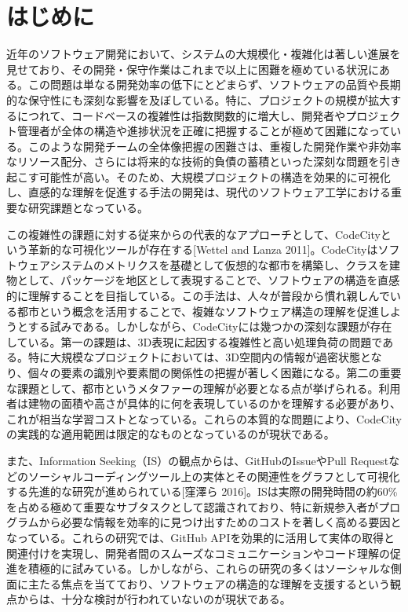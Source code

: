\documentclass[12pt,twoside]{jbook}
\begin{document}
\listoffigures         %
\listoftables          %


%
%
\chapter{はじめに}
近年のソフトウェア開発において、システムの大規模化・複雑化は著しい進展を見せており、その開発・保守作業はこれまで以上に困難を極めている状況にある。この問題は単なる開発効率の低下にとどまらず、ソフトウェアの品質や長期的な保守性にも深刻な影響を及ぼしている。特に、プロジェクトの規模が拡大するにつれて、コードベースの複雑性は指数関数的に増大し、開発者やプロジェクト管理者が全体の構造や進捗状況を正確に把握することが極めて困難になっている。このような開発チームの全体像把握の困難さは、重複した開発作業や非効率なリソース配分、さらには将来的な技術的負債の蓄積といった深刻な問題を引き起こす可能性が高い。そのため、大規模プロジェクトの構造を効果的に可視化し、直感的な理解を促進する手法の開発は、現代のソフトウェア工学における重要な研究課題となっている。

この複雑性の課題に対する従来からの代表的なアプローチとして、CodeCityという革新的な可視化ツールが存在する[Wettel and Lanza 2011]。CodeCityはソフトウェアシステムのメトリクスを基礎として仮想的な都市を構築し、クラスを建物として、パッケージを地区として表現することで、ソフトウェアの構造を直感的に理解することを目指している。この手法は、人々が普段から慣れ親しんでいる都市という概念を活用することで、複雑なソフトウェア構造の理解を促進しようとする試みである。しかしながら、CodeCityには幾つかの深刻な課題が存在している。第一の課題は、3D表現に起因する複雑性と高い処理負荷の問題である。特に大規模なプロジェクトにおいては、3D空間内の情報が過密状態となり、個々の要素の識別や要素間の関係性の把握が著しく困難になる。第二の重要な課題として、都市というメタファーの理解が必要となる点が挙げられる。利用者は建物の面積や高さが具体的に何を表現しているのかを理解する必要があり、これが相当な学習コストとなっている。これらの本質的な問題により、CodeCityの実践的な適用範囲は限定的なものとなっているのが現状である。

また、Information Seeking（IS）の観点からは、GitHubのIssueやPull Requestなどのソーシャルコーディングツール上の実体とその関連性をグラフとして可視化する先進的な研究が進められている[窪澤ら 2016]。ISは実際の開発時間の約60\%を占める極めて重要なサブタスクとして認識されており、特に新規参入者がプログラムから必要な情報を効率的に見つけ出すためのコストを著しく高める要因となっている。これらの研究では、GitHub APIを効果的に活用して実体の取得と関連付けを実現し、開発者間のスムーズなコミュニケーションやコード理解の促進を積極的に試みている。しかしながら、これらの研究の多くはソーシャルな側面に主たる焦点を当てており、ソフトウェアの構造的な理解を支援するという観点からは、十分な検討が行われていないのが現状である。
\end{document}
